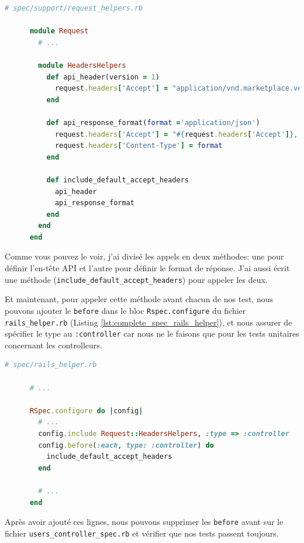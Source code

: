 \documentclass[]{report}
\begin{document}
    \begin{scriptsize}
      \begin{lstlisting}[language=ruby, caption={Ajout d'un helper pour spécifier les headers des tests}, label={lst:add_headers_to_request_helpers}]
      # spec/support/request_helpers.rb

      module Request
        # ...

        module HeadersHelpers
          def api_header(version = 1)
            request.headers['Accept'] = "application/vnd.marketplace.v#{version}"
          end

          def api_response_format(format ='application/json')
            request.headers['Accept'] = "#{request.headers['Accept']}, #{format}"
            request.headers['Content-Type'] = format
          end

          def include_default_accept_headers
            api_header
            api_response_format
          end
        end
      end
      \end{lstlisting}
    \end{scriptsize}

    Comme vous pouvez le voir, j'ai divisé les appels en deux méthodes: une pour définir l'en-tête API et l'autre pour définir le format de réponse. J'ai aussi écrit une méthode (\verb|include_default_accept_headers|) pour appeler les deux.

    Et maintenant, pour appeler cette méthode avant chacun de nos test, nous pouvons ajouter le \verb|before| dans le bloc \verb|Rspec.configure| du fichier \verb|rails_helper.rb| (Listing \ref{lst:complete_spec_rails_helper}), et nous assurer de spécifier le type au \verb|:controller| car nous ne le faisons que pour les tests unitaires concernant les controlleurs.

    \begin{scriptsize}
      \begin{lstlisting}[language=ruby]
      # spec/rails_helper.rb

      # ...

      RSpec.configure do |config|
        # ...
        config.include Request::HeadersHelpers, :type => :controller
        config.before(:each, type: :controller) do
          include_default_accept_headers
        end

        # ...
      end
      \end{lstlisting}
    \end{scriptsize}

    Après avoir ajouté ces lignes, nous pouvons supprimer les \verb|before| avant sur le fichier \verb|users_controller_spec.rb| et vérifier que nos tests passent toujours.
\end{document}
